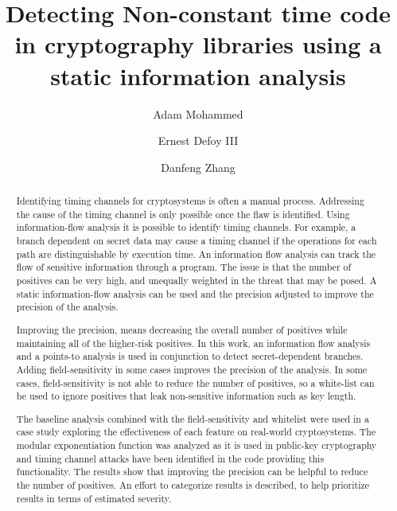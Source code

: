 \documentclass[sigconf, authorversion]{acmart}
\begin{document}
\title{Detecting Non-constant time code in cryptography libraries using a static
  information analysis} 

\author{Adam Mohammed}

\author{Ernest Defoy III}

\author{Danfeng Zhang}


\begin{abstract}
Identifying timing channels for cryptosystems is often a manual process.
Addressing the cause of the timing channel is only possible once the flaw is
identified. Using information-flow analysis it is possible to identify timing
channels. For example, a branch dependent on secret data may cause a timing
channel if the operations for each path are distinguishable by execution time.
An information flow analysis can track the flow of sensitive information
through a program. The issue is that the number of positives can be very high,
and unequally weighted in the threat that may be posed. A static
information-flow analysis can be used and the precision adjusted to improve
the precision of the analysis.

Improving the precision, means decreasing the overall number of positives while
maintaining all of the higher-risk positives. In this work, an
information flow analysis and a points-to analysis is used in conjunction to
detect secret-dependent branches. Adding field-sensitivity in some cases
improves the precision of the analysis. In some cases, field-sensitivity is not
able to reduce the number of positives, so a white-list can be used to ignore
positives that leak non-sensitive information such as key length.

The baseline analysis combined with the field-sensitivity and whitelist were
used in a case study exploring the effectiveness of each feature on real-world
cryptosystems. The modular exponentiation function was analyzed as it is used
in public-key cryptography and timing channel attacks have been identified in the
code providing this functionality. The results show that improving the precision
can be helpful to reduce the number of positives. An effort to categorize
results is described, to help prioritize results in terms of estimated severity.
\end{abstract}
\end{document}

